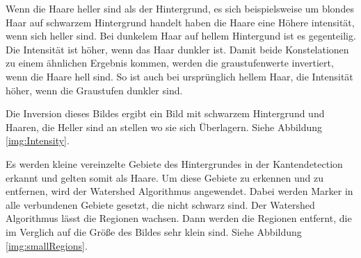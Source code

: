 \documentclass[german,a4paper,12pt,smallheadings,headsepline, titlepage, liststotoc, idextotoc,bibtoctoc,blibliography = totocnumbered]{scrartcl}
\begin{document}
Wenn die Haare heller sind als der Hintergrund, es sich beispielsweise um blondes Haar auf schwarzem Hintergrund handelt haben die Haare eine Höhere intensität, wenn sich heller sind. Bei dunkelem Haar auf hellem Hintergund ist es gegenteilig. Die Intensität ist höher, wenn das Haar dunkler ist.
Damit beide Konstelationen zu einem ähnlichen Ergebnis kommen, werden die graustufenwerte invertiert, wenn die Haare hell sind. So ist auch bei ursprünglich hellem Haar, die Intensität höher, wenn die Graustufen dunkler sind.



Die Inversion dieses Bildes ergibt ein Bild mit schwarzem Hintergrund und Haaren, die Heller sind an stellen wo sie sich Überlagern. Siehe Abbildung \ref{img:Intensity}.


Es werden kleine vereinzelte Gebiete des Hintergrundes in der Kantendetection erkannt und gelten somit als Haare.
Um diese Gebiete zu erkennen und zu entfernen, wird der Watershed Algorithmus angewendet.   
Dabei werden Marker in alle verbundenen Gebiete gesetzt, die nicht schwarz sind. Der Watershed Algorithmus lässt die Regionen wachsen. 
Dann werden die Regionen entfernt, die im Verglich auf die Größe des Bildes sehr klein sind. Siehe Abbildung \ref{img:smallRegions}.
\end{document}
